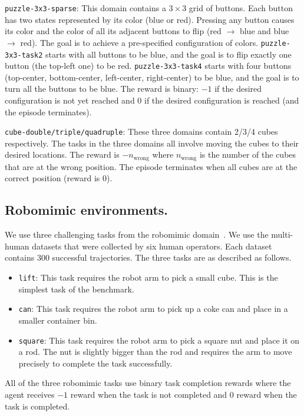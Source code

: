 \texttt{puzzle-3x3-sparse}: This domain contains a $3\times3$ grid of buttons. Each button has two states represented by its color (blue or red). Pressing any button causes its color and the color of all its adjacent buttons to flip (red $\rightarrow$ blue and blue $\rightarrow$ red). The goal is to achieve a pre-specified configuration of colors. \texttt{puzzle-3x3-task2} starts with all buttons to be blue, and the goal is to flip exactly one button (the top-left one) to be red. \texttt{puzzle-3x3-task4} starts with four buttons (top-center, bottom-center, left-center, right-center) to be blue, and the goal is to turn all the buttons to be blue. The reward is binary: $-1$ if the desired configuration is not yet reached and $0$ if the desired configuration is reached (and the episode terminates).


\texttt{cube-double/triple/quadruple}: These three domains contain 2/3/4 cubes respectively. The tasks in the three domains all involve moving the cubes to their desired locations. 
The reward is $-n_{\mathrm{wrong}}$ where $n_{\mathrm{wrong}}$ is the number of the cubes that are at the wrong position. The episode terminates when all cubes are at the correct position (reward is 0).

\subsection{Robomimic environments.} We use three challenging tasks from the robomimic domain~\citep{robomimic2021}.
We use the multi-human datasets that were collected by six human operators. Each dataset contains 300 successful trajectories. The three tasks are as described as follows.
\begin{itemize}
    \item \texttt{lift}: This task requires the robot arm to pick a small cube. This is the simplest task of the benchmark.
    \item \texttt{can}: This task requires the robot arm to pick up a coke can and place in a smaller container bin.
    \item \texttt{square}: This task requires the robot arm to pick a square nut and place it on a rod. The nut is slightly bigger than the rod and requires the arm to move precisely to complete the task successfully.
\end{itemize}

All of the three robomimic tasks use binary task completion rewards where the agent receives $-1$ reward when the task is not completed and $0$ reward when the task is completed.

